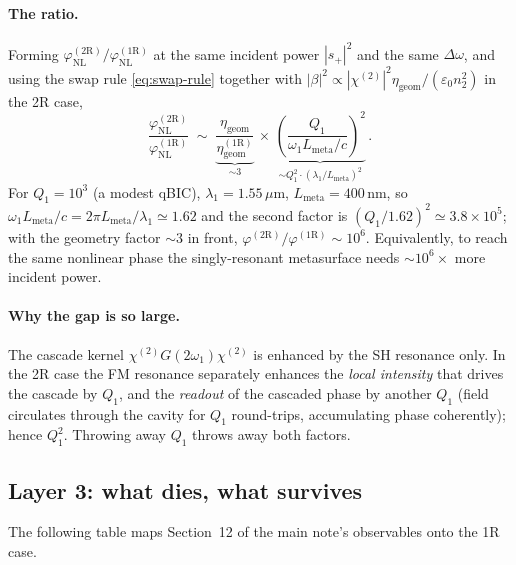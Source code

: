 \documentclass[11pt,a4paper]{article}
\newcommand{\eps}{\varepsilon}
\newcommand{\chitwo}{\chi^{(2)}}
\newcommand{\Dom}{\Delta\omega}
\begin{document}
\paragraph{The ratio.}
Forming $\varphi_\text{NL}^{(2\mathrm R)}/\varphi_\text{NL}^{(1\mathrm R)}$
at the same incident power $|s_+|^{2}$ and the same $\Dom$, and using the
swap rule \eqref{eq:swap-rule} together with $|\beta|^{2}\propto
|\chitwo|^{2}\eta_\text{geom}/(\eps_0 n_2^{2})$ in the 2R case,
\begin{equation}
  \boxed{\;\frac{\varphi_\text{NL}^{(2\mathrm R)}}{\varphi_\text{NL}^{(1\mathrm R)}}
   \;\sim\;
   \underbrace{\frac{\eta_\text{geom}}{\eta_\text{geom}^{(1\mathrm R)}}}_{\sim 3}
   \,\times\,
   \underbrace{\left(\!\frac{Q_1}{\omega_1 L_\text{meta}/c}\!\right)^{\!2}}_{\sim Q_1^{2}\cdot(\lambda_1/L_\text{meta})^{2}}\,.\;}
  \label{eq:phi-ratio}
\end{equation}
For $Q_1=10^{3}$ (a modest qBIC), $\lambda_1=1.55\,\mu$m,
$L_\text{meta}=400$\,nm, so $\omega_1 L_\text{meta}/c=2\pi
L_\text{meta}/\lambda_1\simeq 1.62$ and the second factor is
$(Q_1/1.62)^{2}\!\simeq\!3.8\!\times\!10^{5}$; with the geometry factor
$\sim 3$ in front, $\varphi^{(2\mathrm R)}/\varphi^{(1\mathrm R)}\sim
10^{6}$.  Equivalently, to reach the same nonlinear phase the
singly-resonant metasurface needs $\sim 10^{6}\times$ more incident power.

\paragraph{Why the gap is so large.}
The cascade kernel $\chitwo G(2\omega_1)\chitwo$ is enhanced by the SH
resonance only.  In the 2R case the FM resonance separately enhances the
\emph{local intensity} that drives the cascade by $Q_1$, and the
\emph{readout} of the cascaded phase by another $Q_1$ (field circulates
through the cavity for $Q_1$ round-trips, accumulating phase coherently);
hence $Q_1^{2}$.  Throwing away $Q_1$ throws away both factors.

\subsection*{Layer 3: what dies, what survives}

The following table maps Section~12 of the main note's observables onto
the 1R case.
\end{document}
